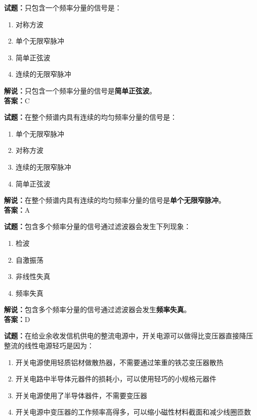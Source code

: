 \documentclass{ctexbook}
\begin{document}
\bigskip


\noindent\textbf{试题：}只包含一个频率分量的信号是：
\begin{enumerate}[leftmargin=3em]
	\item 对称方波
	\item 单个无限窄脉冲
	\item 简单正弦波
	\item 连续的无限窄脉冲
\end{enumerate}

\noindent\textbf{解说：}只包含一个频率分量的信号是\textbf{简单正弦波}。\\\noindent\textbf{答案：}C%


\bigskip


\noindent\textbf{试题：}在整个频谱内具有连续的均匀频率分量的信号是：

\begin{enumerate}[leftmargin=3em]
	\item 单个无限窄脉冲
	\item 对称方波
	\item 连续的无限窄脉冲
	\item 简单正弦波
\end{enumerate}

\noindent\textbf{解说：}在整个频谱内具有连续的均匀频率分量的信号是\textbf{单个无限窄脉冲}。\\\noindent\textbf{答案：}A%


\bigskip


\noindent\textbf{试题：}包含多个频率分量的信号通过滤波器会发生下列现象：

\begin{enumerate}[leftmargin=3em]
	\item 检波
	\item 自激振荡
	\item 非线性失真
	\item 频率失真
\end{enumerate}

\noindent\textbf{解说：}包含多个频率分量的信号通过滤波器会发生\textbf{频率失真}。\\\noindent\textbf{答案：}D%


\bigskip


\noindent\textbf{试题：}在给业余收发信机供电的整流电源中，开关电源可以做得比变压器直接降压整流的线性电源轻巧是因为：

\begin{enumerate}[leftmargin=3em]
	\item 开关电源使用轻质铝材做散热器，不需要通过笨重的铁芯变压器散热
	\item 开关电路中半导体元器件的损耗小，可以使用轻巧的小规格元器件
	\item 开关电源使用了半导体器件，不需要变压器
	\item 开关电源中变压器的工作频率高得多，可以缩小磁性材料截面和减少线圈匝数
\end{enumerate}
\end{document}
